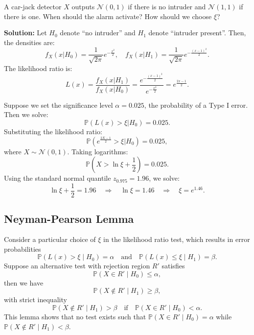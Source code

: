 \begin{eg}
  A car-jack detector \(X\) outputs \(\mathcal{N}(0, 1)\) if there is no intruder and \(\mathcal{N}(1, 1)\) if there is one. When should the alarm activate? How should we choose \(\xi\)?

  \textbf{Solution:}  
  Let \(H_0\) denote ``no intruder'' and \(H_1\) denote ``intruder present''. Then, the densities are:
  \[
    f_X(x \vert H_0) = \dfrac{1}{\sqrt{2\pi}} e^{-\frac{x^2}{2}}, \quad 
    f_X(x \vert H_1) = \dfrac{1}{\sqrt{2\pi}} e^{-\frac{(x - 1)^2}{2}}.
  \]
  The likelihood ratio is:
  \[
    L(x) = \dfrac{f_X(x \vert H_1)}{f_X(x \vert H_0)} = 
    \dfrac{e^{-\frac{(x - 1)^2}{2}}}{e^{-\frac{x^2}{2}}} = 
    e^{\frac{2x - 1}{2}}.
  \]

  Suppose we set the significance level \(\alpha = 0.025\), the probability of a Type I error. Then we solve:
  \[
    \mathbb{P}(L(x) > \xi \vert H_0) = 0.025.
  \]
  Substituting the likelihood ratio:
  \[
    \mathbb{P}(e^{\frac{2X - 1}{2}} > \xi \vert H_0) = 0.025,
  \]
  where \(X \sim \mathcal{N}(0, 1)\). Taking logarithms:
  \[
    \mathbb{P}\left(X > \ln \xi + \frac{1}{2}\right) = 0.025.
  \]
  Using the standard normal quantile \(z_{0.975} = 1.96\), we solve:
  \[
    \ln \xi + \frac{1}{2} = 1.96 \quad \Longrightarrow \quad \ln \xi = 1.46 \quad \Longrightarrow \quad \xi = e^{1.46}.
  \]
\end{eg}

\subsection{Neyman-Pearson Lemma}
Consider a particular choice of \(\xi\) in the likelihood ratio test, which results in error probabilities 
\[
  \mathbb{P}(L(x) > \xi \mid H_0) = \alpha \quad \text{and} \quad \mathbb{P}(L(x) \leq \xi \mid H_1) = \beta.
\]
Suppose an alternative test with rejection region \(R'\) satisfies
\[
  \mathbb{P}(X \in R' \mid H_0) \leq \alpha,
\]
then we have
\[
  \mathbb{P}(X \notin R' \mid H_1) \geq \beta,
\]
with strict inequality
\[
  \mathbb{P}(X \notin R' \mid H_1) > \beta \quad \text{if} \quad \mathbb{P}(X \in R' \mid H_0) < \alpha.
\]
This lemma shows that no test exists such that \(\mathbb{P}(X \in R' \mid H_0) = \alpha\) while \(\mathbb{P}(X \notin R' \mid H_1) < \beta\).
